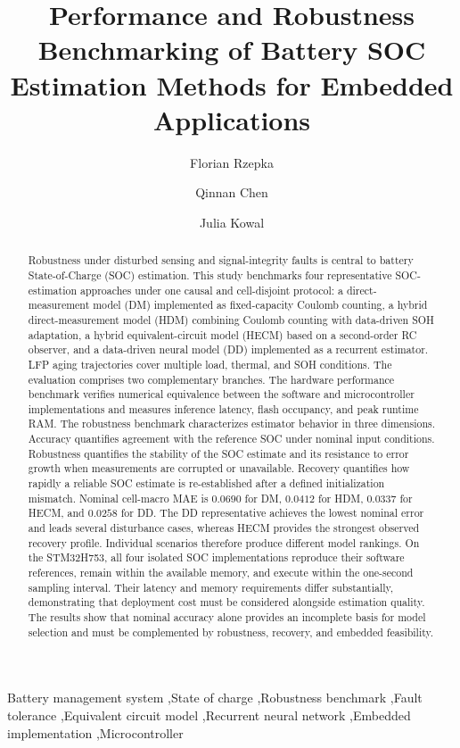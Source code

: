 \documentclass[review,nopreprintline]{elsarticle}
\date{}
\begin{document}
\begin{frontmatter}
\title{Performance and Robustness Benchmarking of Battery SOC Estimation Methods for Embedded Applications}
\author[1]{Florian Rzepka}
\author[1]{Qinnan Chen}
\author[1]{Julia Kowal}
\begin{abstract}
Robustness under disturbed sensing and signal-integrity faults is central to battery State-of-Charge (SOC) estimation. This study benchmarks four representative SOC-estimation approaches under one causal and cell-disjoint protocol: a direct-measurement model (DM) implemented as fixed-capacity Coulomb counting, a hybrid direct-measurement model (HDM) combining Coulomb counting with data-driven SOH adaptation, a hybrid equivalent-circuit model (HECM) based on a second-order RC observer, and a data-driven neural model (DD) implemented as a recurrent estimator. LFP aging trajectories cover multiple load, thermal, and SOH conditions. The evaluation comprises two complementary branches. The hardware performance benchmark verifies numerical equivalence between the software and microcontroller implementations and measures inference latency, flash occupancy, and peak runtime RAM. The robustness benchmark characterizes estimator behavior in three dimensions. Accuracy quantifies agreement with the reference SOC under nominal input conditions. Robustness quantifies the stability of the SOC estimate and its resistance to error growth when measurements are corrupted or unavailable. Recovery quantifies how rapidly a reliable SOC estimate is re-established after a defined initialization mismatch. Nominal cell-macro MAE is $0.0690$ for DM, $0.0412$ for HDM, $0.0337$ for HECM, and $0.0258$ for DD. The DD representative achieves the lowest nominal error and leads several disturbance cases, whereas HECM provides the strongest observed recovery profile. Individual scenarios therefore produce different model rankings. On the STM32H753, all four isolated SOC implementations reproduce their software references, remain within the available memory, and execute within the one-second sampling interval. Their latency and memory requirements differ substantially, demonstrating that deployment cost must be considered alongside estimation quality. The results show that nominal accuracy alone provides an incomplete basis for model selection and must be complemented by robustness, recovery, and embedded feasibility.
\end{abstract}
\begin{keyword}
Battery management system \sep State of charge \sep Robustness benchmark \sep Fault tolerance \sep Equivalent circuit model \sep Recurrent neural network \sep Embedded implementation \sep Microcontroller
\end{keyword}
\end{frontmatter}
\linenumbers
\end{document}
